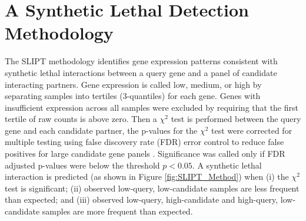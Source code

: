 \section{A Synthetic Lethal Detection Methodology} \label{methods:SLIPT}
The SLIPT methodology identifies gene expression patterns consistent with synthetic lethal interactions between a query gene and a panel of candidate interacting partners. Gene expression is called low, medium, or high by separating samples into tertiles (3-quantiles) for each gene. Genes with insufficient expression across all samples were excluded by requiring that the first tertile of raw counts is above zero. Then a $\chi^2$ test is performed between the query gene and each candidate partner, the p-values for the $\chi^2$ test were corrected for multiple testing using false discovery rate (FDR) error control to reduce false positives for large candidate gene panels \cite{fdr1995}. Significance was called only if FDR adjusted p-values were below the threshold $p < 0.05$. A synthetic lethal interaction is predicted  (as shown in Figure \ref{fig:SLIPT_Method}) when (i) the $\chi^2$ test is significant; (ii) observed low-query, low-candidate samples are less frequent than expected; and (iii) observed low-query, high-candidate and high-query, low-candidate samples are more frequent than expected.

